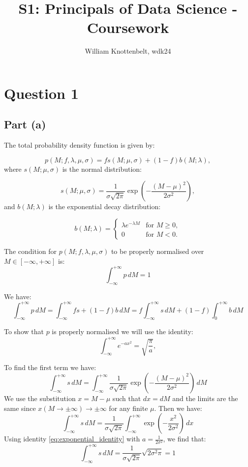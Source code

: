 \documentclass{article}
\title{S1: Principals of Data Science - Coursework}
\author{William Knottenbelt, wdk24}
\begin{document}
\maketitle

\section*{Question 1}
\subsection*{Part (a)}

The total probability density function is given by:

\[ p(M; f, \lambda, \mu, \sigma) = fs(M; \mu, \sigma) + (1-f)b(M; \lambda), \]
where $s(M; \mu, \sigma)$ is the normal distribution:

\[ s(M; \mu, \sigma) = \frac{1}{\sigma\sqrt{2\pi}} \exp\left(-\frac{(M - \mu)^2}{2\sigma^2}\right), \]
and $ b(M; \lambda)$ is the exponential decay distribution:

\[ 
b(M; \lambda) = 
\begin{cases} 
\lambda e^{-\lambda M} & \text{for } M \geq 0, \\
0 & \text{for } M < 0.
\end{cases}
\]

The condition for $p(M; f, \lambda, \mu, \sigma)$ to be properly normalised over $M \in [-\infty, +\infty]$ is:
\[ \int_{-\infty}^{+\infty} p \, dM = 1 \]

We have:
\[ 
\int_{-\infty}^{+\infty} p \, dM = 
\int_{-\infty}^{+\infty} fs + (1-f)b \, dM =
f\int_{-\infty}^{+\infty} s \, dM + 
(1-f)\int_{0}^{+\infty} b \, dM 
\]

To show that $p$ is properly normalised we will use the identity:
\begin{equation}
\int_{-\infty}^{+\infty} e^{-ax^2} = \sqrt{\frac{\pi}{a}},
\label{eq:exponential_identity}
\end{equation}

To find the first term we have:
\[
\int_{-\infty}^{+\infty} s \, dM =
\int_{-\infty}^{+\infty} \frac{1}{\sigma\sqrt{2\pi}} \exp\left(-\frac{(M - \mu)^2}{2\sigma^2}\right) \, dM 
\]
We use the substitution $x = M - \mu$ such that $dx = dM$ and the limits are the same since $x(M \to \pm\infty) \to \pm\infty$ for any finite $\mu$. Then we have:
\[
\int_{-\infty}^{+\infty} s \, dM =
\frac{1}{\sigma\sqrt{2\pi}} \int_{-\infty}^{+\infty} \exp\left(-\frac{x^2}{2\sigma^2}\right) \, dx 
\]
Using identity \eqref{eq:exponential_identity} with $a = \frac{1}{2\sigma^2}$, we find that:
\[
\int_{-\infty}^{+\infty} s \, dM =
\frac{1}{\sigma\sqrt{2\pi}} \sqrt{2\sigma^2\pi} = 1
\]
\end{document}

